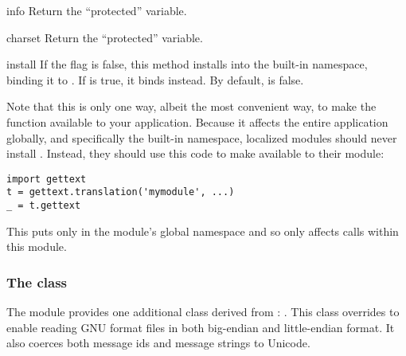 \begin{methoddesc}[NullTranslations]{info}{}
Return the ``protected''  variable.
\end{methoddesc}

\begin{methoddesc}[NullTranslations]{charset}{}
Return the ``protected''  variable.
\end{methoddesc}

\begin{methoddesc}[NullTranslations]{install}{}
If the  flag is false, this method installs
 into the built-in namespace, binding it to
\samp{_}.  If  is true, it binds 
instead.  By default,  is false.

Note that this is only one way, albeit the most convenient way, to
make the \function{_} function available to your application.  Because it
affects the entire application globally, and specifically the built-in
namespace, localized modules should never install \function{_}.
Instead, they should use this code to make \function{_} available to
their module:

\begin{verbatim}
import gettext
t = gettext.translation('mymodule', ...)
_ = t.gettext
\end{verbatim}

This puts \function{_} only in the module's global namespace and so
only affects calls within this module.
\end{methoddesc}

\subsubsection{The  class}

The  module provides one additional class derived from
: .  This class
overrides  to enable reading GNU 
format  files in both big-endian and little-endian format.
It also coerces both message ids and message strings to Unicode.

